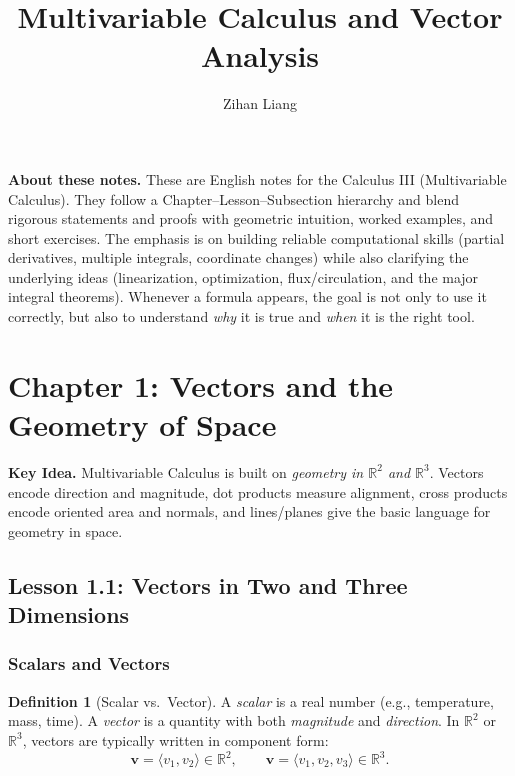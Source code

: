 \documentclass[12pt]{article}
\title{Multivariable Calculus and Vector Analysis}
\author{Zihan Liang}
\numberwithin{equation}{section}
\newcommand{\RR}{\mathbb{R}}
\newcommand{\vect}[1]{\boldsymbol{#1}}   %
\theoremstyle{plain}
\theoremstyle{definition}
\newtheorem{definition}[theorem]{Definition}
\theoremstyle{remark}
\newenvironment{keyidea}{\begin{tcolorbox}\textbf{Key Idea.}}{\end{tcolorbox}}
\begin{document}
\maketitle

\noindent\textbf{About these notes.}
These are English notes for the Calculus III (Multivariable Calculus).
They follow a Chapter--Lesson--Subsection hierarchy and blend rigorous statements and proofs with geometric intuition, worked examples, and short exercises.
The emphasis is on building reliable computational skills (partial derivatives, multiple integrals, coordinate changes) while also clarifying the underlying ideas (linearization, optimization, flux/circulation, and the major integral theorems).
Whenever a formula appears, the goal is not only to use it correctly, but also to understand \emph{why} it is true and \emph{when} it is the right tool.

\tableofcontents
\newpage


\section{Chapter 1: Vectors and the Geometry of Space}

\begin{keyidea}
Multivariable Calculus is built on \emph{geometry in $\RR^2$ and $\RR^3$}. Vectors encode direction and magnitude, dot products measure alignment, cross products encode oriented area and normals, and lines/planes give the basic language for geometry in space.
\end{keyidea}

\subsection{Lesson 1.1: Vectors in Two and Three Dimensions}

\subsubsection{Scalars and Vectors}

\begin{definition}[Scalar vs.\ Vector]
A \emph{scalar} is a real number (e.g., temperature, mass, time).  
A \emph{vector} is a quantity with both \emph{magnitude} and \emph{direction}. In $\RR^2$ or $\RR^3$, vectors are typically written in component form:
\[
\vect{v}=\langle v_1,v_2\rangle \in \RR^2,
\qquad
\vect{v}=\langle v_1,v_2,v_3\rangle \in \RR^3.
\]
\end{definition}
\end{document}
